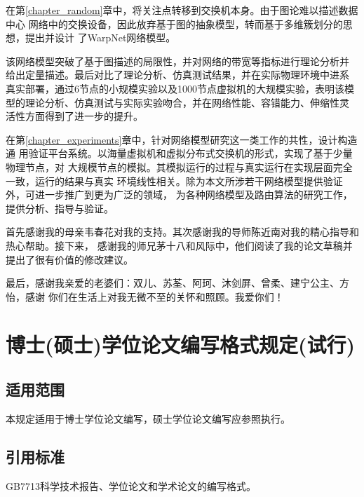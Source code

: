\documentclass[master]{njuthesis}
\begin{document}
在第\ref{chapter_random}章中，将关注点转移到交换机本身。由于图论难以描述数据中心
网络中的交换设备，因此放弃基于图的抽象模型，转而基于多维簇划分的思想，提出并设计
了WarpNet网络模型。

该网络模型突破了基于图描述的局限性，并对网络的带宽等指标进行理论分析并
给出定量描述。最后对比了理论分析、仿真测试结果，并在实际物理环境中进系
真实部署，通过6节点的小规模实验以及1000节点虚拟机的大规模实验，表明该模
型的理论分析、仿真测试与实际实验吻合，并在网络性能、容错能力、伸缩性灵
活性方面得到了进一步的提升。

在第\ref{chapter_experiments}章中，针对网络模型研究这一类工作的共性，设计构造通
用验证平台系统。以海量虚拟机和虚拟分布式交换机的形式，实现了基于少量物理节点，对
大规模节点的模拟。其模拟运行的过程与真实运行在实现层面完全一致，运行的结果与真实
环境线性相关。除为本文所涉若干网络模型提供验证外，可进一步推广到更为广泛的领域，
为各种网络模型及路由算法的研究工作，提供分析、指导与验证。

\begin{acknowledgement}
  首先感谢我的母亲韦春花对我的支持。其次感谢我的导师陈近南对我的精心指导和热心帮助。接下来，
  感谢我的师兄茅十八和风际中，他们阅读了我的论文草稿并提出了很有价值的修改建议。

  最后，感谢我亲爱的老婆们：双儿、苏荃、阿珂、沐剑屏、曾柔、建宁公主、方怡，感谢
  你们在生活上对我无微不至的关怀和照顾。我爱你们！
\end{acknowledgement}

\appendix

\chapter{博士(硕士)学位论文编写格式规定(试行)}

\section{适用范围}

本规定适用于博士学位论文编写，硕士学位论文编写应参照执行。

\section{引用标准}

GB7713科学技术报告、学位论文和学术论文的编写格式。
\end{document}
